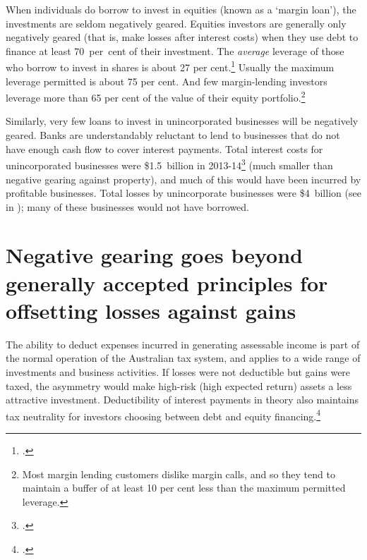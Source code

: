 When individuals do borrow to invest in equities (known as a ‘margin loan’), the investments are seldom negatively geared. Equities investors are generally only negatively geared (that is, make losses after interest costs) when they use debt to finance at least 70~per~cent of their investment.  The \emph{average} leverage of those who borrow to invest in shares is about 27 per cent.\footcite[][Table~D2]{RBA2015StatsMarginLending} Usually the maximum leverage permitted is about 75 per cent. And few margin-lending investors leverage more than 65 per cent of the value of their equity portfolio.\footnote{Most margin lending customers dislike margin calls, and so they tend to maintain a buffer of at least 10 per cent less than the maximum permitted leverage.}

Similarly, very few loans to invest in unincorporated businesses will be negatively geared. Banks are understandably reluctant to lend to businesses that do not have enough cash flow to cover interest payments. Total interest costs for unincorporated businesses were \$1.5~billion in 2013-14\footcite{ATOTaxstats201314} (much smaller than negative gearing against property), and much of this would have been incurred by profitable businesses. Total losses by unincorporate businesses were \$4~billion (see  in ); many of these businesses would not have borrowed. 

\section{Negative gearing goes beyond generally accepted principles for offsetting losses against gains}\label{sec:NG-goes-beyond-accepted-principles-for-offsetting-losses}
The ability to deduct expenses incurred in generating assessable income is part of the normal operation of the Australian tax system, and applies to a wide range of investments and business activities. If losses were not deductible but gains were taxed, the asymmetry would make high-risk (high expected return) assets a less attractive investment. Deductibility of interest payments in theory also maintains tax neutrality for investors choosing between debt and equity financing.\footcite{FaneRichardson2004}   

